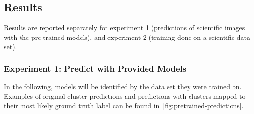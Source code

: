 \subsection{Results}
Results are reported separately for experiment 1 (predictions of scientific images with the pre-trained models), and experiment 2 (training done on a scientific data set).

\subsubsection{Experiment 1: Predict with Provided Models}
In the following, models will be identified by the data set they were trained on.
Examples of original cluster predictions and predictions with clusters mapped to their most likely ground truth label can be found in~\autoref{fig:pretrained-predictions}.


